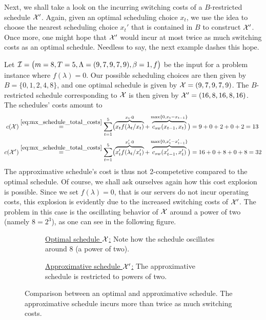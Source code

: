 Next, we shall take a look on the incurring switching costs of a $B$-restricted schedule $\mathcal{X}'$. Again, given an optimal scheduling choice $x_t$, we use the idea to choose the nearest scheduling choice $x_t'$ that is contained in $B$ to construct $\mathcal{X}'$. Once more, one might hope that $\mathcal{X}'$ would incur at most twice as much switching costs as an optimal schedule. Needless to say, the next example dashes this hope.
\begin{exmpl}
Let $\mathcal{I}=\bigl(m=8,T=5,\Lambda=(9,7,9,7,9),\beta=1,f\bigr)$ be the input for a problem instance where $f(\lambda)=0$. Our possible scheduling choices are then given by $B=\{0,1,2,4,8\}$, and one optimal schedule is given by $\mathcal{X}=(9,7,9,7,9)$. The $B$-restricted schedule corresponding to $\mathcal{X}$ is then given by $\mathcal{X}'=(16,8,16,8,16)$. The schedules' costs amount to
\begin{align*}
	c(\mathcal{X})&\stackrel{\eqref{eq:mx_schedule_total_costs}}{=}\sum\limits_{t=1}^{5}\bigl(\overbrace{x_tf(\lambda_t/x_t)}^{x_t\cdot 0}+\overbrace{c_{sw}(x_{t-1},x_t)}^{\max\{0,x_t-x_{t-1}\}}\bigr)=9+0+2+0+2=13\\
	c(\mathcal{X}')&\stackrel{\eqref{eq:mx_schedule_total_costs}}{=}\sum\limits_{t=1}^{5}\bigl(\overbrace{x_t'f(\lambda_t/x_t')}^{x_t'\cdot 0}+\overbrace{c_{sw}(x_{t-1}',x_t')}^{\max\{0,x_t'-x_{t-1}'\}}\bigr)=16+0+8+0+8=32
\end{align*}
The approximative schedule's cost is thus not 2-competetive compared to the optimal schedule. Of course, we shall ask ourselves again how this cost explosion is possible. Since we set $f(\lambda)=0$, that is our servers do not incur operating costs, this explosion is evidently due to the increased switching costs of $\mathcal{X}'$. The problem in this case is the oscillating behavior of $\mathcal{X}$ around a power of two (namely $8=2^3$), as one can see in the following figure. 
\begin{figure}[H]
\captionsetup[subfigure]{labelformat=empty}
\begin{subfigure}[b]{0.47\textwidth}

	\caption{\underline{Optimal schedule $\mathcal{X}$:} Note how the schedule oscillates around 8 (a power of two).}
\end{subfigure}
\hfill
\begin{subfigure}[b]{0.47\textwidth}

	\caption{\underline{Approximative schedule $\mathcal{X}'$:} The approximative schedule is restricted to powers of two.}
\end{subfigure}
\caption{Comparison between an optimal and approximative schedule. The approximative schedule incurs more than twice as much switching costs.}
\label{fig:adaption-schedule}
\end{figure}
\end{exmpl}
